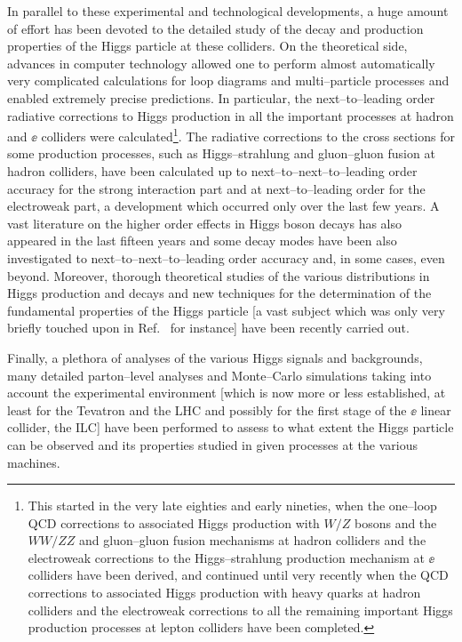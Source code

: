 In parallel to these experimental and technological developments, a huge amount
of effort has been devoted to the detailed study of the decay and production
properties of the Higgs particle at these colliders. On the theoretical side,
advances in computer technology allowed one to perform almost automatically
very complicated calculations for loop diagrams and multi--particle processes
and enabled extremely precise predictions.  In particular, the
next--to--leading order radiative corrections to Higgs production in all the
important processes at hadron and $\ee$ colliders were calculated\footnote{This
started in the very late eighties and early nineties, when the one--loop QCD
corrections to associated Higgs production with $W/Z$ bosons and the $WW/ZZ$
and gluon--gluon fusion mechanisms at hadron colliders and the electroweak
corrections to the Higgs--strahlung production mechanism at $\ee$ colliders
have been derived, and continued until very recently when the QCD corrections
to associated Higgs production with heavy quarks at hadron colliders and the
electroweak corrections to all the remaining important Higgs production
processes at lepton colliders have been completed.}.  The radiative corrections
to the cross sections for some production processes, such as Higgs--strahlung
and gluon--gluon fusion at hadron colliders, have been calculated up to
next--to--next--to--leading order accuracy for the strong interaction part and
at next--to--leading order for the electroweak part, a development which
occurred only over the last few years. A vast literature on the higher order
effects in Higgs boson decays has also appeared in the last fifteen years and
some decay modes have been also investigated to next--to--next--to--leading
order accuracy and, in some cases, even beyond.  Moreover, thorough theoretical
studies of the various distributions in Higgs production and decays and new
techniques for the determination of the fundamental properties of the Higgs
particle [a vast subject which was only very briefly touched upon in
Ref.~\cite{HHG} for instance] have been recently carried out.\s

Finally, a plethora of analyses of the various Higgs signals and backgrounds,
many detailed parton--level analyses and Monte--Carlo simulations taking into
account the experimental environment [which is now more or less established, at
least for the Tevatron and the LHC and possibly for the first stage of the
$\ee$ linear collider, the ILC] have been performed to assess to what extent 
the Higgs particle can be observed and its properties studied in given 
processes at the various machines.

